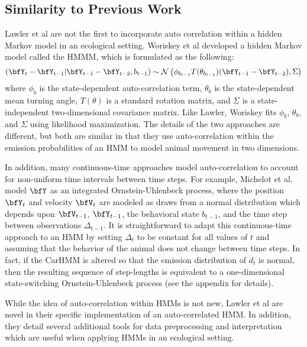 \subsection{Similarity to Previous Work}

Lawler et al are not the first to incorporate auto correlation within a hidden Markov model in an ecological setting. Woriskey et al \citep{Whoriskey:2016} developed a hidden Markov model called the HMMM, which is formulated as the following:
%
$$\left(\bfY_t - \bfY_{t-1} |\bfY_{t-1} - \bfY_{t-2}, b_{t-1}\right) \sim \mathcal{N}\left( \phi_{b_{t-1}} T(\theta_{b_{t-1}})(\bfY_{t-1} - \bfY_{t-2}),\Sigma\right)$$
%
where $\phi_b$ is the state-dependent auto-correlation term, $\theta_b$ is the state-dependent mean turning angle, $T(\theta)$ is a standard rotation matrix, and $\Sigma$ is a state-independent two-dimensional covariance matrix. Like Lawler, Woriskey fits $\phi_b$, $\theta_b$, and $\Sigma$ using likelihood maximization. The details of the two approaches are different, but both are similar in that they use auto-correlation within the emission probabilities of an HMM to model animal movement in two dimensions.

In addition, many continuous-time approaches model auto-correlation to account for non-uniform time intervals between time steps. For example, Michelot et al. \citep{Michelot:2019} model $\bfY$ as an integrated Ornstein-Uhlenbeck process, where the position $\bfY_t$ and velocity $\bfV_t$ are modeled as draws from a normal distribution which depends upon $\bfV_{t-1}$, $\bfY_{t-1}$, the behavioral state $b_{t-1}$, and the time step between observations $\Delta_{t-1}$. It is straightforward to adapt this continuous-time approach to an HMM by setting $\Delta_{t}$ to be constant for all values of $t$ and assuming that the behavior of the animal does not change between time steps. In fact, if the CarHMM is altered so that the emission distribution of $d_t$ is normal, then the resulting sequence of step-lengths is equivalent to a one-dimensional state-switching Ornstein-Uhlenbeck process (see the appendix for details).

While the idea of auto-correlation within HMMs is not new, Lawler et al are novel in their specific implementation of an auto-correlated HMM. In addition, they detail several additional tools for data preprocessing and interpretation which are useful when applying HMMs in an ecological setting.

\fi